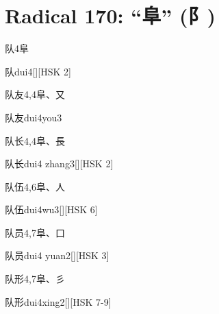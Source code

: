 
\section*{Radical 170: ``⾩'' (⻖)}

\begin{Entry}{队}{4}{⾩}
  \begin{Phonetics}{队}{dui4}[][HSK 2]
  \end{Phonetics}
\end{Entry}

\begin{Entry}{队友}{4,4}{⾩、⼜}
  \begin{Phonetics}{队友}{dui4you3}
  \end{Phonetics}
\end{Entry}

\begin{Entry}{队长}{4,4}{⾩、⾧}
  \begin{Phonetics}{队长}{dui4 zhang3}[][HSK 2]
  \end{Phonetics}
\end{Entry}

\begin{Entry}{队伍}{4,6}{⾩、⼈}
  \begin{Phonetics}{队伍}{dui4wu3}[][HSK 6]
  \end{Phonetics}
\end{Entry}

\begin{Entry}{队员}{4,7}{⾩、⼝}
  \begin{Phonetics}{队员}{dui4 yuan2}[][HSK 3]
  \end{Phonetics}
\end{Entry}

\begin{Entry}{队形}{4,7}{⾩、⼺}
  \begin{Phonetics}{队形}{dui4xing2}[][HSK 7-9]
  \end{Phonetics}
\end{Entry}

